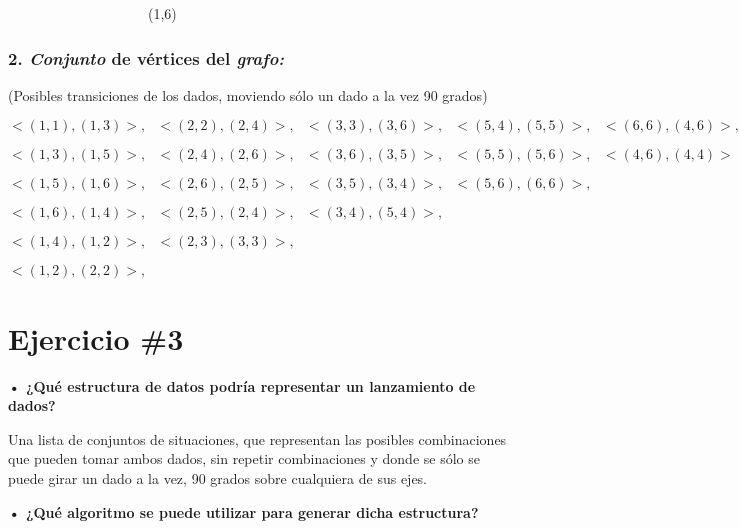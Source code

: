 \documentclass[11pt,letterpaper]{article}
\begin{document}
\ \ \ \ \ \ \ \ \ \ \ \ \ \ \ \ \ \ \ \ (1,6)

\subsubsection*{\textbf{2. \emph{Conjunto} de vértices del \emph{grafo:}}}

(Posibles transiciones de los dados, moviendo sólo un dado a la vez 90 grados)
\bigskip

\noindent$<(1,1),(1,3)>,\ \ \ <(2,2),(2,4)>,\ \ \ <(3,3),(3,6)>,\ \ \ <(5,4),(5,5)>,\ \ \ <(6,6),(4,6)>,$

\noindent$<(1,3),(1,5)>,\ \ \ <(2,4),(2,6)>,\ \ \ <(3,6),(3,5)>,\ \ \ <(5,5),(5,6)>,\ \ \ <(4,6),(4,4)>$

\noindent$<(1,5),(1,6)>,\ \ \ <(2,6),(2,5)>,\ \ \ <(3,5),(3,4)>,\ \ \ <(5,6),(6,6)>,$

\noindent$<(1,6),(1,4)>,\ \ \ <(2,5),(2,4)>,\ \ \ <(3,4),(5,4)>,$

\noindent$<(1,4),(1,2)>,\ \ \ <(2,3),(3,3)>,$

\noindent$<(1,2),(2,2)>,$

\pagebreak

\section*{\textbf{Ejercicio \#3}}
\textbf{• ¿Qué estructura de datos podría representar un lanzamiento de dados?}

Una lista de conjuntos de situaciones, que representan las posibles combinaciones que pueden tomar ambos dados, sin repetir combinaciones y donde se sólo se puede girar un dado a la vez, 90 grados sobre cualquiera de sus ejes. \bigskip

\textbf{• ¿Qué algoritmo se puede utilizar para generar dicha estructura?}
\end{document}
